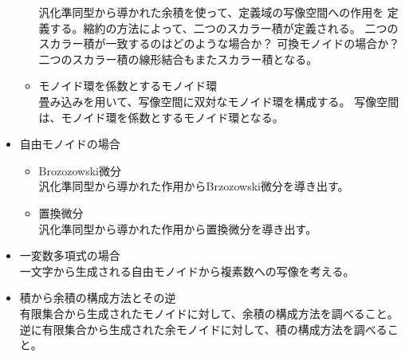 \begin{itemize}
\begin{itemize}
			汎化準同型から導かれた余積を使って、定義域の写像空間への作用を
			定義する。縮約の方法によって、二つのスカラー積が定義される。
			二つのスカラー積が一致するのはどのような場合か？
			可換モノイドの場合か？
			二つのスカラー積の線形結合もまたスカラー積となる。
			\item モノイド環を係数とするモノイド環 \\
			畳み込みを用いて、写像空間に双対なモノイド環を構成する。
			写像空間は、モノイド環を係数とするモノイド環となる。
		\end{itemize}
		\item 自由モノイドの場合
		\begin{itemize}
			\item Brozozowski微分\\
			汎化準同型から導かれた作用からBrzozowski微分を導き出す。
			\item 置換微分\\
			汎化準同型から導かれた作用から置換微分を導き出す。
		\end{itemize}
		\item 一変数多項式の場合 \\
		一文字から生成される自由モノイドから複素数への写像を考える。
		\item 積から余積の構成方法とその逆 \\
		有限集合から生成されたモノイドに対して、余積の構成方法を調べること。
		逆に有限集合から生成された余モノイドに対して、積の構成方法を調べること。
	\end{itemize}

